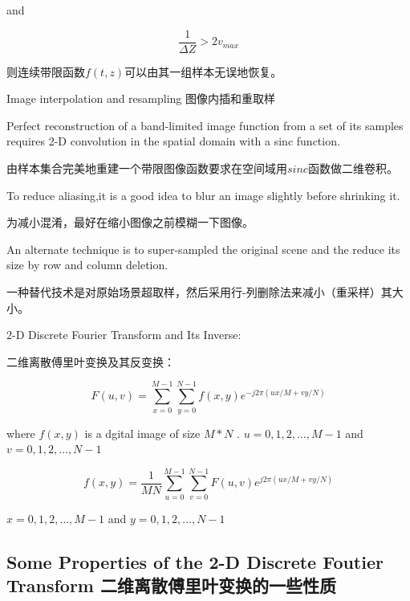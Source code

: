 \documentclass[12pt]{article}
\numberwithin{equation}{section}%
\begin{document}
and 

\begin{equation} \label{4.25}
\frac{1}{\Delta Z}>2v_{max}
\end{equation}

则连续带限函数$f(t,z)$可以由其一组样本无误地恢复。

\begin{description}

\item [Image interpolation and resampling 图像内插和重取样]

\end{description}

Perfect reconstruction of a band-limited image function from a set of its samples requires 2-D convolution in the spatial domain with a sinc function.

由样本集合完美地重建一个带限图像函数要求在空间域用$sinc$函数做二维卷积。

To reduce aliasing,it is a good idea to blur an image slightly before shrinking it.

为减小混淆，最好在缩小图像之前模糊一下图像。


An alternate technique is to super-sampled the original scene and the reduce its size by row and column deletion.

一种替代技术是对原始场景超取样，然后采用行-列删除法来减小（重采样）其大小。

2-D Discrete Fourier Transform and Its Inverse:

二维离散傅里叶变换及其反变换：

\begin{equation} \label{4.26}
F(u,v)=\sum_{x=0}^{M-1}\sum_{y=0}^{N-1}f(x,y)e^{-j2\pi(ux/M+vy/N)}
\end{equation}

where $f(x,y)$ is a dgital image of size $M*N$ . $u=0,1,2,\ldots,M-1$ and $v=0,1,2,\ldots,N-1$

\begin{equation} \label{4.27}
f(x,y)=\frac{1}{MN}\sum_{u=0}^{M-1}\sum_{v=0}^{N-1}F(u,v)e^{j2\pi(ux/M+vy/N)}
\end{equation}

$x=0,1,2,\ldots,M-1$ and $y=0,1,2,\ldots,N-1$
	   
\subsection{Some Properties of the 2-D Discrete Foutier Transform 二维离散傅里叶变换的一些性质}
\end{document}
